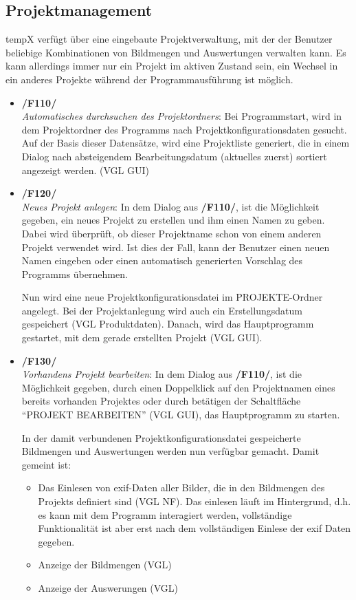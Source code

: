 \subsection{Projektmanagement}
	\gls{tempX} verfügt über eine eingebaute Projektverwaltung, mit der der Benutzer beliebige Kombinationen von Bildmengen und Auswertungen verwalten kann. Es kann allerdings immer nur ein Projekt im aktiven Zustand sein, ein Wechsel in ein anderes Projekte während der Programmausführung ist möglich.
	\begin{itemize}
		
		\item \textbf{/F110/}\\ \textit{Automatisches durchsuchen des Projektordners}: Bei Programmstart, wird in dem Projektordner des Programms nach Projektkonfigurationsdaten gesucht. Auf der Basis dieser Datensätze, wird eine Projektliste generiert, die in einem Dialog nach absteigendem Bearbeitungsdatum (aktuelles zuerst) sortiert angezeigt werden. (VGL GUI)
		
		\item \textbf{/F120/}\\ \textit{Neues Projekt anlegen}: In dem Dialog aus \textbf{/F110/}, ist die Möglichkeit gegeben, ein neues Projekt zu erstellen und ihm einen Namen zu geben.\\ Dabei wird überprüft, ob dieser Projektname schon von einem anderen Projekt verwendet wird. Ist dies der Fall, kann der Benutzer einen neuen Namen eingeben oder einen automatisch generierten Vorschlag des Programms übernehmen.\par Nun wird eine neue Projektkonfigurationsdatei im PROJEKTE-Ordner angelegt. Bei der Projektanlegung wird auch ein Erstellungsdatum gespeichert (VGL Produktdaten). Danach, wird das Hauptprogramm gestartet, mit dem gerade erstellten Projekt (VGL GUI).
		
		\item \textbf{/F130/}\\ \textit{Vorhandens Projekt bearbeiten}: In dem Dialog aus \textbf{/F110/}, ist die Möglichkeit gegeben, durch einen Doppelklick auf den Projektnamen eines bereits vorhanden Projektes oder durch betätigen der Schaltfläche "`PROJEKT BEARBEITEN"' (VGL GUI), das Hauptprogramm zu starten.\par In der damit verbundenen Projektkonfigurationsdatei gespeicherte Bildmengen und Auswertungen werden nun verfügbar gemacht. Damit gemeint ist: 
			\begin{itemize}
				\item Das Einlesen von \gls{exif}-Daten aller Bilder, die in den Bildmengen des Projekts definiert sind (VGL NF). Das einlesen läuft im Hintergrund, d.h. es kann mit dem Programm interagiert werden, vollständige Funktionalität ist aber erst nach dem vollständigen Einlese der \gls{exif} Daten gegeben.
				\item Anzeige der Bildmengen (VGL)
				\item Anzeige der Auswerungen (VGL)
			\end{itemize}		
		

\end{itemize}
